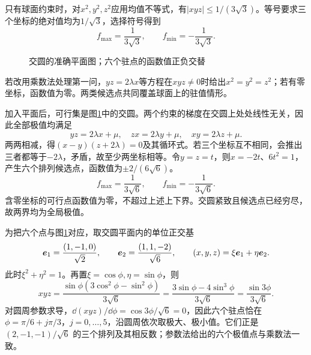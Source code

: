 \begin{solution}
只有球面约束时，对$x^2,y^2,z^2$应用均值不等式，有$|xyz|\le1/(3\sqrt3)$。等号要求三个坐标的绝对值均为$1/\sqrt3$，选择符号得到
\[
 \boxed{f_{\max}=\frac1{3\sqrt3},\qquad f_{\min}=-\frac1{3\sqrt3}}.
\]


\begin{figure}[H]\centering
{}
\caption{交圆的准确平面图；六个驻点的函数值正负交替}\label{fig:hw2-7-s}
\end{figure}


若改用乘数法处理第一问，$yz=2\lambda x$等方程在$xyz\ne0$时给出$x^2=y^2=z^2$；若有零坐标，函数值为零。两类候选点共同覆盖球面上的驻值情形。

加入平面后，可行集是图\ref{fig:hw2-7-s}中的交圆。两个约束的梯度在交圆上处处线性无关，因此全部极值均满足
\[
 yz=2\lambda x+\mu,\quad zx=2\lambda y+\mu,\quad xy=2\lambda z+\mu.
\]
两两相减，得$(x-y)(z+2\lambda)=0$及其循环式。若三个坐标互不相同，会推出三者都等于$-2\lambda$，矛盾，故至少两坐标相等。令$y=z=t$，则$x=-2t$、$6t^2=1$，产生六个排列候选点，函数值为$\pm2/(6\sqrt6)$。
\[
 \boxed{f_{\max}=\frac1{3\sqrt6},\qquad f_{\min}=-\frac1{3\sqrt6}}.
\]
含零坐标的可行点函数值为零，不超过上述上下界。交圆紧致且候选点已经穷尽，故两界均为全局极值。


为把六个点与图\ref{fig:hw2-7-s}对应，取交圆平面内的单位正交基
\[
 \bm{e}_1=\frac{(1,-1,0)}{\sqrt2},\qquad
 \bm{e}_2=\frac{(1,1,-2)}{\sqrt6},\qquad
 (x,y,z)=\xi\bm{e}_1+\eta\bm{e}_2.
\]
此时$\xi^2+\eta^2=1$。再置$\xi=\cos\phi,\eta=\sin\phi$，则
\[
 xyz=\frac{\sin\phi(3\cos^2\phi-\sin^2\phi)}{3\sqrt6}
 =\frac{3\sin\phi-4\sin^3\phi}{3\sqrt6}
 =\frac{\sin3\phi}{3\sqrt6}.
\]
对圆周参数求导，$\dd(xyz)/\dd\phi=\cos3\phi/\sqrt6=0$，因此六个驻点恰在 $\phi=\pi/6+j\pi/3$，$j=0,\ldots,5$，沿圆周依次取极大、极小值。它们正是 $(2,-1,-1)/\sqrt6$ 的三个排列及其相反数；参数法给出的六个极值点与乘数法一致。

\end{solution}



